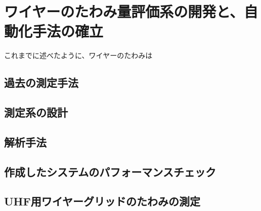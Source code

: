 \documentclass[../../main.tex]{subfiles}
\begin{document}
\chapter{ワイヤーのたわみ量評価系の開発と、自動化手法の確立}
\label{chap:wiresag}
これまでに述べたように、ワイヤーのたわみは

\section{過去の測定手法}

\section{測定系の設計}

\section{解析手法}

\section{作成したシステムのパフォーマンスチェック}

\section{UHF用ワイヤーグリッドのたわみの測定}
\end{document}
